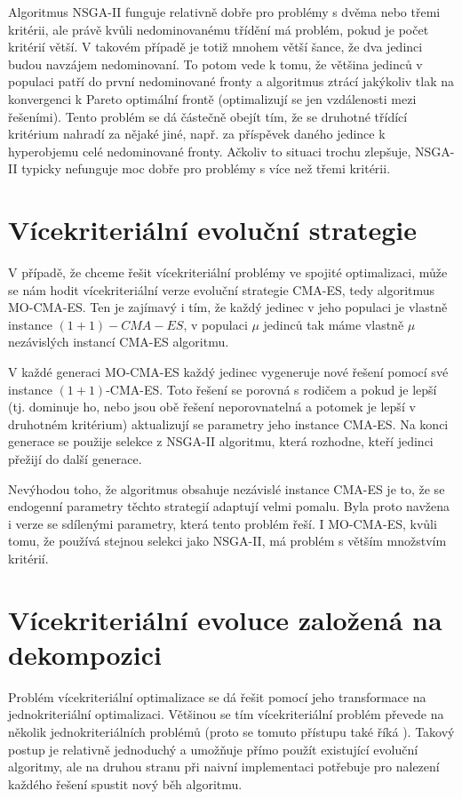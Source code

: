 Algoritmus NSGA-II funguje relativně dobře pro problémy s dvěma nebo třemi kritérii, ale právě kvůli nedominovanému třídění má problém, pokud je počet kritérií větší. V takovém případě je totiž mnohem větší šance, že dva jedinci budou navzájem nedominovaní. To potom vede k tomu, že většina jedinců v populaci patří do první nedominované fronty a algoritmus ztrácí jakýkoliv tlak na konvergenci k Pareto optimální frontě (optimalizují se jen vzdálenosti mezi řešeními). Tento problém se dá částečně obejít tím, že se druhotné třídící kritérium nahradí za nějaké jiné, např. za příspěvek daného jedince k hyperobjemu celé nedominované fronty. Ačkoliv to situaci trochu zlepšuje, NSGA-II typicky nefunguje moc dobře pro problémy s více než třemi kritérii.

\section{Vícekriteriální evoluční strategie}

V případě, že chceme řešit vícekriteriální problémy ve spojité optimalizaci, může se nám hodit vícekriteriální verze evoluční strategie CMA-ES, tedy algoritmus MO-CMA-ES. Ten je zajímavý i tím, že každý jedinec v jeho populaci je vlastně instance $(1+1)-CMA-ES$, v populaci $\mu$ jedinců tak máme vlastně $\mu$ nezávislých instancí CMA-ES algoritmu. 

V každé generaci MO-CMA-ES každý jedinec vygeneruje nové řešení pomocí své instance $(1+1)$-CMA-ES. Toto řešení se porovná s rodičem a pokud je lepší (tj. dominuje ho, nebo jsou obě řešení neporovnatelná a potomek je lepší v druhotném kritérium) aktualizují se parametry jeho instance CMA-ES. Na konci generace se použije selekce z NSGA-II algoritmu, která rozhodne, kteří jedinci přežijí do další generace. 

Nevýhodou toho, že algoritmus obsahuje nezávislé instance CMA-ES je to, že se endogenní parametry těchto strategií adaptují velmi pomalu. Byla proto navžena i verze se sdílenými parametry, která tento problém řeší. I MO-CMA-ES, kvůli tomu, že používá stejnou selekci jako NSGA-II, má problém s větším množstvím kritérií. 

\section{Vícekriteriální evoluce založená na dekompozici}

Problém vícekriteriální optimalizace se dá řešit pomocí jeho transformace na jednokriteriální optimalizaci. Většinou se tím vícekriteriální problém převede na několik jednokriteriálních problémů (proto se tomuto přístupu také říká ). Takový postup je relativně jednoduchý a umožňuje přímo použít existující evoluční algoritmy, ale na druhou stranu při naivní implementaci potřebuje pro nalezení každého řešení spustit nový běh algoritmu. 

